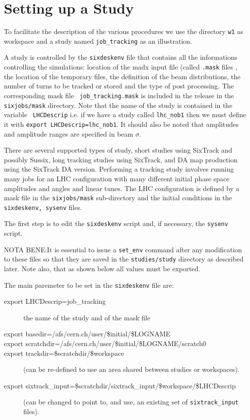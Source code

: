 \documentclass{article}    %
\begin{document}
\section{Setting up a Study}
\label{sec:study}

To facilitate the description of the various procedures we use the directory
{\tt w1} as workspace and a study named {\tt job\_tracking} as an illustration.

A study is controlled by the {\tt sixdeskenv} file that contains all the
informations controlling the simulations: location of the madx input file
(called {\tt .mask} files , the location of the temporary files, the
definition of the beam distributions, the number of turns to be tracked or
stored and the type of post processing. The corresponding mask file {\tt
job\_tracking.mask} is included in the release in the {\tt sixjobs/mask}
directory. Note that the name of the study is contained in the variable {\tt
LHCDescrip} i.e. if we have a study called {\tt lhc\_nob1} then we must define
it with {\tt export LHCDescrip=lhc\_nob1}. It should also be noted that
amplitudes and amplitude ranges are specified in beam $\sigma$.

There are several supported types of study, short studies using SixTrack and
possibly Sussix, long tracking studies using SixTrack, and DA map production
using the SixTrack DA version.  Performing a tracking study involves running
many jobs for an LHC configuration with many different initial phase space
amplitudes and angles and linear tunes. The LHC configuration is defined by a
mask file in the {\tt sixjobs/mask} sub-directory and the initial conditions
in the {\tt sixdeskenv, sysenv} files.

The first step is to edit the {\tt sixdeskenv} script and, if necessary, the
{\tt sysenv} script.

NOTA BENE:It is essential to issue a {\tt set\_env} command after any
modification to these files so that they are saved in the {\tt studies/study}
directory as described later.  Note also, that as shown below all values must
be exported.

The main paremeter to be set in the {\tt sixdeskenv} file are:
\begin{description}
\item [export LHCDescrip=job\_tracking] the name of the study and of the mask file
\item [export basedir=/afs/cern.ch/user/\$initial/\$LOGNAME]
\item [export scratchdir=/afs/cern.ch/user/\$initial/\$LOGNAME/scratch0]
\item [export trackdir=\$scratchdir/\$workspace]
(can be re-defined to use an area shared between studies or workspaces).
\item [export sixtrack\_input=\$scratchdir/sixtrack\_input/\$workspace/\$LHCDescrip]
(can be changed to point to, and use, an existing set of {\tt sixtrack\_input} files).
\end{description}
\end{document}
